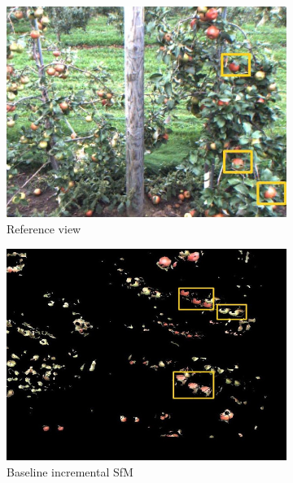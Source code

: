  \begin{figure}[!htbp]
        \centering
\begin{subfigure}[t]{.23\textwidth}
                \includegraphics[width=\textwidth]{figures/isfm/original.jpg}
                \caption{Reference view}
                \label{fig:orig}
        \end{subfigure} \begin{subfigure}[t]{.23\textwidth}
                \includegraphics[width=\textwidth]{figures/isfm/isfmreproj1.jpg}
                \caption{Baseline incremental SfM}
                \label{fig:isfmbase}
        \end{subfigure} \begin{subfigure}[t]{.23\textwidth}

\end{subfigure}
\end{figure}
